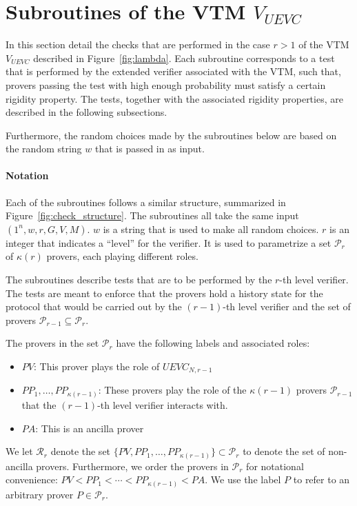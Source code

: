 
\section{Subroutines of the VTM $V_{UEVC}$}

In this section detail the checks that are performed in the case $r>1$ of the VTM $V_{UEVC}$ described in Figure~\ref{fig:lambda}. Each subroutine corresponds to a test that is performed by the extended verifier associated with the VTM, such that, provers passing the test with high enough probability must satisfy a certain rigidity property. The tests, together with the associated rigidity properties, are described in the following subsections. 

Furthermore, the random choices made by the subroutines below are based on the random string $w$ that is passed in as input. 

\paragraph{Notation} Each of the subroutines follows a similar structure, summarized in Figure~\ref{fig:check_structure}. The subroutines all take the same input $(1^n,w,r,G,V,M)$. $w$ is a string that is used to make all random choices. $r$ is an integer that indicates a ``level'' for the verifier. It is used to parametrize a set $\mathcal{P}_r$ of $\kappa(r)$ provers, each playing different roles. 

The subroutines describe tests that are to be performed by the $r$-th level verifier. The tests are meant to enforce that the provers hold a history state for the protocol that would be carried out by the $(r-1)$-th level verifier and the set of provers $\mathcal{P}_{r-1} \subseteq \mathcal{P}_r$. 

The provers in the set $\mathcal{P}_r$ have the following labels and associated roles:
\begin{itemize}
	\item $PV$: This prover plays the role of $UEVC_{N,r-1}$
	\item $PP_1,\ldots,PP_{\kappa(r-1)}$: These provers play the role of the $\kappa(r-1)$ provers $\mathcal{P}_{r-1}$ that the $(r-1)$-th level verifier interacts with.
	\item $PA$: This is an ancilla prover
\end{itemize}
We let $\mathcal{R}_r$ denote the set $\{PV,PP_1,\ldots,PP_{\kappa(r-1)} \} \subset \mathcal{P}_r$ to denote the set of non-ancilla provers. Furthermore, we order the provers in $\mathcal{P}_r$ for notational convenience: $PV < PP_1 < \cdots < PP_{\kappa(r-1)} < PA$. 
We use the label $P$ to refer to an arbitrary prover $P\in\mathcal{P}_r$. 

